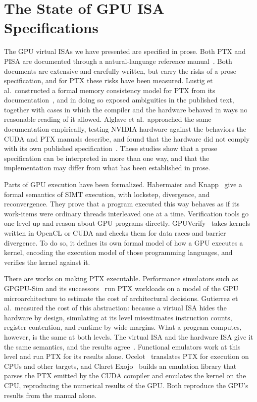 \section{The State of GPU ISA Specifications}
\label{sec:gpu-isa-state}

The GPU virtual ISAs we have presented are specified in prose. Both PTX and
PISA are documented through a natural-language reference
manual~\cite{ptx-isa, pisa-spec}. Both documents are extensive and
carefully written, but carry the risks of a prose specification, and for PTX
these risks have been measured. Lustig et al.\ constructed a formal memory
consistency model for PTX from its documentation~\cite{lustig-ptx-mcm},
and in doing so exposed ambiguities in the published text, together with
cases in which the compiler and the hardware behaved in ways no reasonable
reading of it allowed. Alglave et al.\ approached the same documentation
empirically, testing NVIDIA hardware against the behaviors the CUDA and PTX
manuals describe, and found that the hardware did not comply with its own
published specification~\cite{alglave-gpu-concurrency}. These studies
show that a prose specification can be interpreted in more than one way, and
that the implementation may differ from what has been established in prose.

Parts of GPU execution have been formalized. Habermaier and
Knapp~\cite{habermaier-simt} give a formal semantics of SIMT execution,
with lockstep, divergence, and reconvergence. They prove that a program
executed this way behaves as if its work-items were ordinary threads
interleaved one at a time. Verification tools go one level up and reason
about GPU programs directly. GPUVerify~\cite{gpuverify} takes kernels
written in OpenCL or CUDA and checks them for data races and barrier
divergence. To do so, it defines its own formal model of how a GPU executes
a kernel, encoding the execution model of those programming languages, and
verifies the kernel against it.

There are works on making PTX executable. Performance simulators such as
GPGPU-Sim and its successors~\cite{gpgpu-sim,accel-sim} run PTX
workloads on a model of the GPU microarchitecture to estimate the cost of
architectural decisions. Gutierrez et al.\ measured the cost of this abstraction: because a
virtual ISA hides the hardware by design, simulating at its level
misestimates instruction counts, register contention, and runtime by
wide margins. What a program computes, however, is the same at both
levels. The virtual ISA and the hardware ISA give it the same
semantics, and the results agree~\cite{gutierrez-lost-abstraction}.
Functional emulators work at this level and run PTX for its results alone.
Ocelot~\cite{ocelot} translates PTX for execution on CPUs and other
targets, and Claret Exojo~\cite{claret-ptx-emulation} builds an emulation
library that parses the PTX emitted by the CUDA compiler and emulates the
kernel on the CPU, reproducing the numerical results of the GPU. Both
reproduce the GPU's results from the manual alone.

